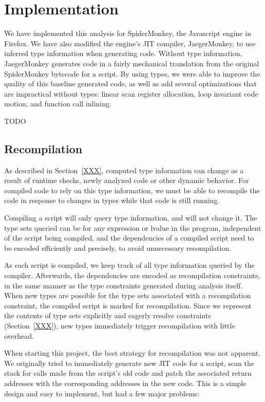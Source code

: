 
\section{Implementation}

We have implemented this analysis for SpiderMonkey, the Javascript engine
in Firefox.
We have also modified the engine's JIT compiler, JaegerMonkey, to use
inferred type information when generating code.
Without type information, JaegerMonkey generates code in a fairly mechanical
translation from the original SpiderMonkey bytecode for a script.
By using types, we were able to improve the quality of this
baseline generated code, as well as add several optimizations that
are impractical without types: linear scan register allocation, loop invariant
code motion, and function call inlining.

TODO

\subsection{Recompilation}

As described in Section~\ref{XXX}, computed type information can change as
a result of runtime checks, newly analyzed code or other dynamic behavior.
For compiled code to rely on this type information, we must be able
to recompile the code in response to changes in types while that code is
still running.

Compiling a script will only query type information, and will not change it.
The type sets queried can be for any expression or lvalue in the program,
independent of the script being compiled,
and the dependencies of a compiled script need to be encoded efficiently
and precisely, to avoid unnecessary recompilation.

As each script is compiled, we keep track of all type information queried
by the compiler.
Afterwards, the dependencies are encoded as recompilation constraints,
in the same manner as the type constraints generated during analysis itself.
When new types are possible for the type sets associated with a recompilation
constraint, the compiled script is marked for recompilation.
Since we represent the contents of type sets explicitly and eagerly resolve
constraints (Section~\ref{XXX}), new types immediately
trigger recompilation with little overhead.

When starting this project, the best strategy for recompilation
was not apparent.
We originally tried to immediately generate new JIT code for a script,
scan the stack for calls made from the script's old code and patch the
associated return addresses with the corresponding addresses in the
new code.
This is a simple design and easy to implement, but had a few major problems:

